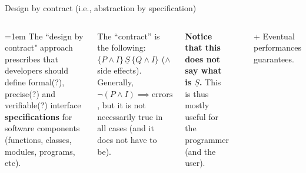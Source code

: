 \documentclass[10pt,
aspectratio=169
]{beamer}
\begin{document}
\begin{frame}{Design by contract (i.e., abstraction by specification)}
	\vspace*{1em}
	\begin{columns}
	\parskip=1em
	The ``design by contract" approach prescribes that developers should define formal(?), precise(?) and verifiable(?) interface \textbf{specifications} for software components (functions, classes, modules, programs, etc). 
	
	The ``contract'' is the following: $\{P\land I\} \,\underline{S}\,\{Q\land I\}$ ($\land$ side effects). Generally, $\lnot (P \land I)\implies \text{errors}$, but it is not necessarily true in all cases (and it does not have to be). 
	
	\textbf{Notice that this does not say what is $\underline{S}$.} This is thus mostly useful for the programmer (and the user).
	
	\begin{center}
	\end{center}
	\vspace*{1em}
	+ Eventual performances guarantees.
	\end{columns}
\end{frame}
\end{document}
